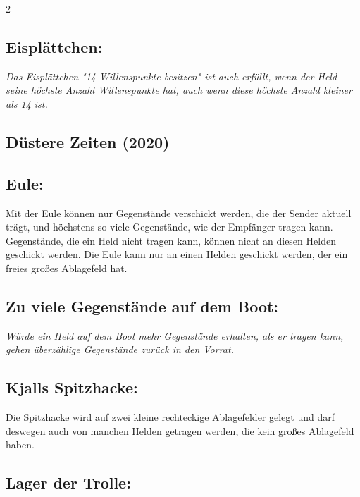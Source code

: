 \documentclass[10pt, a4paper, oneside]{book}
\newcommand{\fan}[1]{\textit{#1}}
\begin{document}
\begin{multicols*}{2}
\begin{bgcolor}[color-ag]
\subsection{Eisplättchen:}

\fan{Das Eisplättchen "14 Willenspunkte besitzen" ist auch erfüllt, wenn der Held seine höchste Anzahl Willenspunkte hat, auch wenn diese höchste Anzahl kleiner als 14 ist.}

\end{bgcolor}





\begin{bgcolor}[color-dz]
\section{Düstere Zeiten (2020)}

\subsection{Eule:}


Mit der Eule können nur Gegenstände verschickt werden, die der Sender aktuell trägt, und höchstens so viele Gegenstände, wie der Empfänger tragen kann. Gegenstände, die ein Held nicht tragen kann, können nicht an diesen Helden geschickt werden. Die Eule kann nur an einen Helden geschickt werden, der ein freies großes Ablagefeld hat.
\supercite{dz-begleitheft}


\subsection{Zu viele Gegenstände auf dem Boot:}

\fan{Würde ein Held auf dem Boot mehr Gegenstände erhalten, als er tragen kann, gehen überzählige Gegenstände zurück in den Vorrat.}


\subsection{Kjalls Spitzhacke:}

Die Spitzhacke wird auf zwei kleine rechteckige Ablagefelder gelegt und darf deswegen auch von manchen Helden getragen werden, die kein großes Ablagefeld haben.


\subsection{Lager der Trolle:}


\end{bgcolor}
\end{multicols*}
\end{document}

